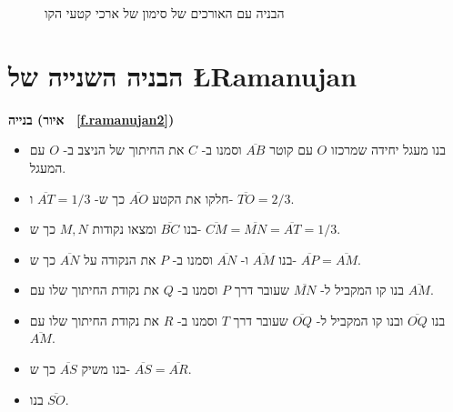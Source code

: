 \begin{figure}[htb]
\begin{center}
\end{center}
\caption{הבניה עם האורכים של סימון של ארכי קטעי הקו}\label{f.ramanujan1a}
\end{figure}





\section{הבניה השנייה של
\L{Ramanujan}}\label{s.square-ramanujan-second}

\textbf{%
בנייה (איור%
~\ref{f.ramanujan2})}

\begin{itemize}
\item
בנו מעגל יחידה שמרכזו
$O$
עם קוטר
$\overline{AB}$
וסמנו ב-%
$C$
את החיתוך של הניצב ב-%
$O$
עם המעגל.
\item
חלקו את הקטע
$\overline{AO}$
כך ש-%
$\overline{AT}=1/3$ 
ו-%
$\overline{TO}=2/3$.
\item
בנו
$\overline{BC}$
ומצאו נקודות
$M,N$
כך ש-%
$\overline{CM}=\overline{MN}=\overline{AT}=1/3$.
\item
בנו 
$\overline{AM}$
ו-%
$\overline{AN}$
וסמנו ב-%
$P$
את הנקודה על
$\overline{AN}$
כך ש-%
$\overline{AP}=\overline{AM}$.
\item
בנו קו המקביל ל-%
$\overline{MN}$
שעובר דרך
$P$
וסמנו ב-%
$Q$
את נקודת החיתוך שלו עם
$\overline{AM}$.
\item
בנו
$\overline{OQ}$
ובנו קו המקביל ל-%
$\overline{OQ}$
שעובר דרך 
$T$
וסמנו ב-%
$R$
את נקודת החיתוך שלו עם
$\overline{AM}$.
\item
בנו משיק
$\overline{AS}$
כך ש-%
$\overline{AS}=\overline{AR}$.
\item
בנו
$\overline{SO}$.
\end{itemize}



